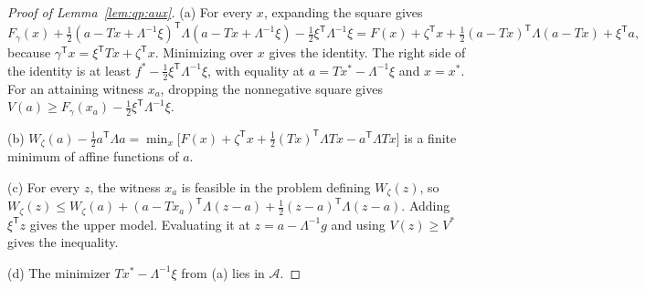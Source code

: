 \begin{proof}[Proof of Lemma~\ref{lem:qp:aux}]
(a) For every $x$, expanding the square gives
\[
 F_\gamma(x)+\tfrac12(a-Tx+\Lambda^{-1}\xi)^{\mathsf T}\Lambda(a-Tx+\Lambda^{-1}\xi)
 -\tfrac12\xi^{\mathsf T}\Lambda^{-1}\xi
 =F(x)+\zeta^{\mathsf T} x+\tfrac12(a-Tx)^{\mathsf T}\Lambda(a-Tx)+\xi^{\mathsf T} a ,
\]
because $\gamma^{\mathsf T} x=\xi^{\mathsf T} Tx+\zeta^{\mathsf T} x$. Minimizing over $x$ gives
the identity. The right side of the identity is at least
$f^*-\frac12\xi^{\mathsf T}\Lambda^{-1}\xi$, with equality at $a=Tx^*-\Lambda^{-1}\xi$
and $x=x^*$. For an attaining witness $x_a$, dropping the nonnegative square
gives $V(a)\ge F_\gamma(x_a)-\frac12\xi^{\mathsf T}\Lambda^{-1}\xi$.

(b) $W_\zeta(a)-\frac12a^{\mathsf T}\Lambda a=\min_x\bigl[F(x)+\zeta^{\mathsf T} x+\frac12(Tx)^{\mathsf T}\Lambda Tx-a^{\mathsf T}\Lambda Tx\bigr]$
is a finite minimum of affine functions of $a$.

(c) For every $z$, the witness $x_a$ is feasible in the problem defining
$W_\zeta(z)$, so
$W_\zeta(z)\le W_\zeta(a)+(a-Tx_a)^{\mathsf T}\Lambda(z-a)+\frac12(z-a)^{\mathsf T}\Lambda(z-a)$.
Adding $\xi^{\mathsf T} z$ gives the upper model. Evaluating it at
$z=a-\Lambda^{-1}g$ and using $V(z)\ge V^*$ gives the inequality.

(d) The minimizer $Tx^*-\Lambda^{-1}\xi$ from (a) lies in $\mathcal A$.
\end{proof}

